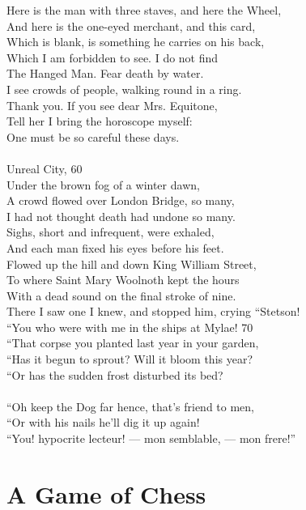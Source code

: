 \documentclass{article}
\begin{document}
Here is the man with three staves, and here the Wheel, \\
And here is the one-eyed merchant, and this card, \\
Which is blank, is something he carries on his back, \\
Which I am forbidden to see. I do not find \\
The Hanged Man. Fear death by water. \\
I see crowds of people, walking round in a ring. \\
Thank you. If you see dear Mrs. Equitone, \\
Tell her I bring the horoscope myself: \\
One must be so careful these days. \\
 \\
Unreal City,                                                      \hfill 60 \\
Under the brown fog of a winter dawn, \\
A crowd flowed over London Bridge, so many, \\
I had not thought death had undone so many. \\
Sighs, short and infrequent, were exhaled, \\
And each man fixed his eyes before his feet. \\
Flowed up the hill and down King William Street, \\
To where Saint Mary Woolnoth kept the hours \\
With a dead sound on the final stroke of nine. \\
There I saw one I knew, and stopped him, crying ``Stetson! \\
``You who were with me in the ships at Mylae!                      \hfill 70 \\
``That corpse you planted last year in your garden, \\
``Has it begun to sprout? Will it bloom this year? \\
``Or has the sudden frost disturbed its bed? \\
 \\
``Oh keep the Dog far hence, that's friend to men, \\
``Or with his nails he'll dig it up again! \\
``You! hypocrite lecteur! --- mon semblable, --- mon frere!''

\section{A Game of Chess}
\end{document}
